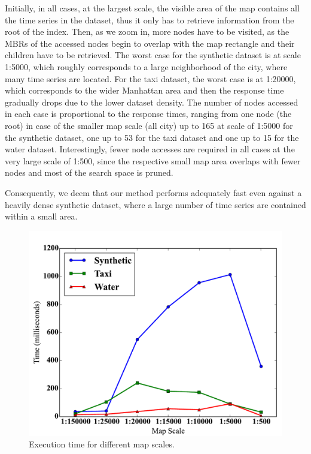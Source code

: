 Initially, in all cases, at the largest scale, the visible area of the map contains all the time series in the dataset, thus it only has to retrieve information from the root of the index. Then, as we zoom in, more nodes have to be visited, as the MBRs of the accessed nodes begin to overlap with the map rectangle and their children have to be retrieved. The worst case for the synthetic dataset is at scale 1:5000, which roughly corresponds to a large neighborhood of the city, where many time series are located. For the taxi dataset, the worst case is at 1:20000, which corresponds to the wider Manhattan area and then the response time gradually drops due to the lower dataset density. The number of nodes accessed in each case is proportional to the response times, ranging from one node (the root) in case of the smaller map scale (all city) up to 165 at scale of 1:5000 for the synthetic dataset, one up to 53 for the taxi dataset and one up to 15 for the water dataset. Interestingly, fewer node accesses are required in all cases at the very large scale of 1:500, since the respective small map area overlaps with fewer nodes and most of the search space is pruned. 

Consequently, we deem that our method performs adequately fast even against a heavily dense synthetic dataset, where a large number of time series are contained within a small area.


\begin{figure}[!t]
 \centering
 \includegraphics[width=\columnwidth]{figures/zoom_levels.pdf}
 \vspace{-15pt}
 \caption{Execution time for different map scales.}
 \label{fig:zoom}
\end{figure}

